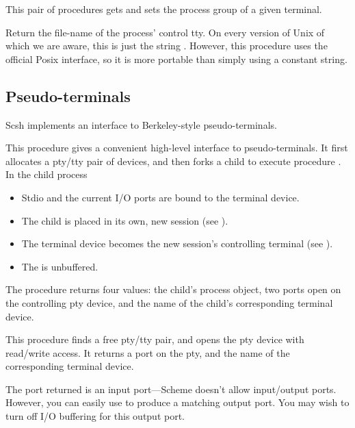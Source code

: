 \begin{desc}
This pair of procedures gets and sets the process group of a given
terminal.
\end{desc}

\begin{desc}
Return the file-name of the process' control tty.
On every version of Unix of which we are aware, this is just the string
.
However, this procedure uses the official Posix interface, so it is more
portable than simply using a constant string.
\end{desc}


\subsection{Pseudo-terminals}
Scsh implements an interface to Berkeley-style pseudo-terminals.

\begin{desc}
This procedure gives a convenient high-level interface to pseudo-terminals.
It first allocates a pty/tty pair of devices, and then forks a child
to execute procedure .
In the child process
\begin{itemize}
\item Stdio and the current I/O ports are bound to the terminal device.
\item The child is placed in its own, new session
            (see ).
\item The terminal device becomes the new session's controlling terminal
            (see ).
\item The  is unbuffered.
\end{itemize}

The  procedure returns four values:
the child's process object, two ports open on the controlling pty device,
and the name of the child's corresponding terminal device.
\end{desc}

\begin{desc}
This procedure finds a free pty/tty pair, and opens the pty device
with read/write access.
It returns a port on the pty, 
and the name of the corresponding terminal device.

The port returned is an input port---Scheme doesn't allow input/output
ports.
However, you can easily use 
to produce a matching output port.
You may wish to turn off I/O buffering for this output port.
\end{desc}


